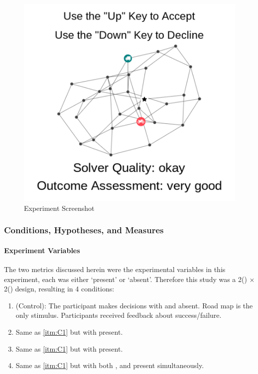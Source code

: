     \begin{figure}[tb]
        \centering
        \includegraphics[width=0.8\linewidth]{Figures/experiment_screenshot_Compressed.png}
        \caption{Experiment Screenshot}
        \label{fig:screenshot}
    \end{figure}

    \subsubsection{Conditions, Hypotheses, and Measures} \label{sec:hyp_cond_meas}
    \paragraph{Experiment Variables}
    The two \famsec{} metrics discussed herein were the experimental variables in this experiment, each was either `present' or `absent'. Therefore this study was a 2(\xQ) $\times$ 2(\xO) design, resulting in 4 conditions:

    \begin{enumerate}[label=\textbf{C\arabic*}]
        \item (Control): The participant makes decisions with \xQ{} and \xO{} absent. Road map is the only stimulus. Participants received feedback about success/failure. \label{itm:C1}
        \item Same as \ref{itm:C1} but with \xQ{} present.\label{itm:C2}
        \item Same as \ref{itm:C1} but with \xO{} present. \label{itm:C3}
        \item Same as \ref{itm:C1} but with both \xQ{}, and \xO{} present simultaneously. \label{itm:C4}
    \end{enumerate}


